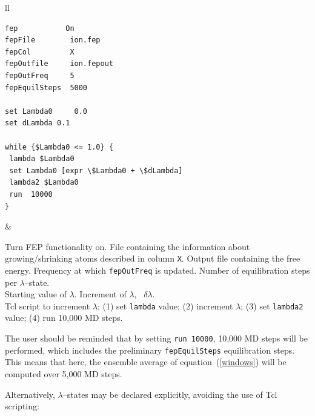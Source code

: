 \begin{tabular}{ll}
\begin{minipage}{8cm}
\begin{verbatim}
fep           On
fepFile        ion.fep
fepCol         X
fepOutfile     ion.fepout
fepOutFreq     5
fepEquilSteps  5000

set Lambda0     0.0
set dLambda 0.1

while {$Lambda0 <= 1.0} {
 lambda $Lambda0
 set Lambda0 [expr \$Lambda0 + \$dLambda]
 lambda2 $Lambda0
 run  10000
}
\end{verbatim}
\end{minipage}
&
\begin{minipage}{7.8cm}
Turn FEP functionality on.
\newline
File containing the information about growing/shrinking atoms
described in column {\tt X}.
\newline
Output file containing the free energy.
\newline
Frequency at which {\tt fepOutFreq} is updated.
\newline
Number of equilibration steps per $\lambda$--state.
\\[0.6cm]
Starting value of $\lambda$.
\newline
Increment of $\lambda$, \ie~$\delta \lambda$.
\\[0.6cm]
{\sc Tcl} script to increment $\lambda$:
\newline
\hspace{0.4cm} (1) set {\tt lambda} value;
\newline
\hspace{0.4cm} (2) increment $\lambda$;
\newline
\hspace{0.4cm} (3) set {\tt lambda2} value;
\newline
\hspace{0.4cm} (4) run 10,000 MD steps.
\\
\end{minipage}
\end{tabular}


The user should be reminded that by setting {\tt run  10000},
10,000 MD steps will be performed, which includes the
preliminary {\tt fepEquilSteps} equilibration steps.
This means that here, the ensemble average of equation~({\ref{windows}})
will be computed  over 5,000 MD steps.


Alternatively, $\lambda$--states may be declared
explicitly, avoiding the use of {\sc Tcl} scripting:

